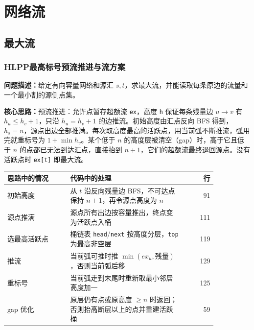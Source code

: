

\Needspace{180pt}

\chapter{网络流}

\section{最大流}

\subsection{HLPP最高标号预流推进与流方案}\label{compact-HLPP}

\noindent\textbf{问题描述：}\allowbreak 给定有向容量网络和源汇 $s,t$，求最大流，并能读取每条原边的流量和一个最小割的源侧点集。

\textbf{核心思路：}\allowbreak 预流推进：允许点暂存超额流 \texttt{ex}，高度 \texttt{h} 保证每条残量边 $u\to v$ 有 $h_u\le h_v+1$，只沿 $h_u=h_v+1$ 的边推流。初始高度由汇点反向 BFS 得到，$h_s=n$，源点出边全部推满。每次取高度最高的活跃点，用当前弧不断推流，弧用完就重标号为 $1+\min h_v$。某个低于 $n$ 的高度层被清空（gap）时，高于它且低于 $n$ 的点都已无法到达汇点，直接抬到 $n+1$，它们的超额流最终退回源点。没有活跃点时 \texttt{ex[t]} 即最大流。

\begin{center}\small
\begin{tabular}{@{}p{0.30\linewidth}p{0.55\linewidth}r@{}}
\toprule
思路中的情况 & 代码中的处理 & 行\\
\midrule
初始高度 & 从 $t$ 沿反向残量边 BFS，不可达点保持 $n+1$，再令源点高度为 $n$ & 91\\
源点推满 & 源点所有出边按容量推出，终点变为活跃点入桶 & 111\\
选最高活跃点 & 桶链表 \texttt{head}/\texttt{next} 按高度分层，\texttt{top} 为最高非空层 & 119\\
推流 & 当前弧可推时推 $\min(ex_u,\text{残量})$，否则当前弧后移 & 129\\
重标号 & 当前弧走到末尾时重新取最小邻居高度加一 & 125\\
gap 优化 & 原层仍有点或原高度 $\ge n$ 时返回；否则抬高断层以上的点并重建活跃桶 & 59\\
\bottomrule
\end{tabular}
\end{center}




